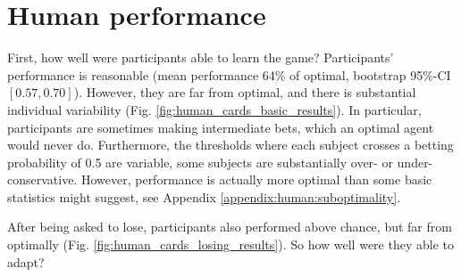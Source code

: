 \section{Human performance}
First, how well were participants able to learn the game? Participants' performance is reasonable (mean performance 64\% of optimal, bootstrap 95\%-CI \([0.57, 0.70]\)). However, they are far from optimal, and there is substantial individual variability (Fig. \ref{fig:human_cards_basic_results}). In particular, participants are sometimes making intermediate bets, which an optimal agent would never do. Furthermore, the thresholds where each subject crosses a betting probability of 0.5 are variable, some subjects are substantially over- or under-conservative. However, performance is actually more optimal than some basic statistics might suggest, see Appendix \ref{appendix:human:suboptimality}. \par 
After being asked to lose, participants also performed above chance, but far from optimally (Fig. \ref{fig:human_cards_losing_results}). So how well were they able to adapt? 

